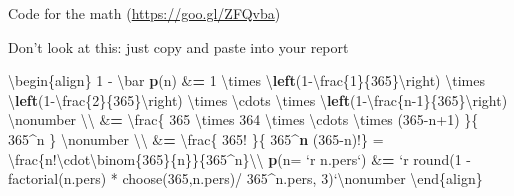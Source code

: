 \documentclass[ignorenonframetext,]{beamer}
\newenvironment{Shaded}{\begin{snugshade}}{\end{snugshade}}
\newcommand{\KeywordTok}[1]{\textcolor[rgb]{0.13,0.29,0.53}{\textbf{{#1}}}}
\newcommand{\DataTypeTok}[1]{\textcolor[rgb]{0.13,0.29,0.53}{{#1}}}
\newcommand{\DecValTok}[1]{\textcolor[rgb]{0.00,0.00,0.81}{{#1}}}
\newcommand{\StringTok}[1]{\textcolor[rgb]{0.31,0.60,0.02}{{#1}}}
\newcommand{\ErrorTok}[1]{\textcolor[rgb]{0.64,0.00,0.00}{\textbf{{#1}}}}
\newcommand{\NormalTok}[1]{{#1}}
\begin{document}
\begin{frame}[fragile]{Code for the math (\url{https://goo.gl/ZFQvba})}

Don't look at this: just copy and paste into your report

\begin{Shaded}
\begin{Highlighting}[]
\NormalTok{\textbackslash{}begin\{align\} }
 \DecValTok{1} \NormalTok{-}\StringTok{ }\NormalTok{\textbackslash{}bar }\KeywordTok{p}\NormalTok{(n) &}\ErrorTok{=}\StringTok{ }\DecValTok{1} \NormalTok{\textbackslash{}times \textbackslash{}}\KeywordTok{left}\NormalTok{(}\DecValTok{1}\NormalTok{-\textbackslash{}frac\{}\DecValTok{1}\NormalTok{\}\{}\DecValTok{365}\NormalTok{\}\textbackslash{}right) }
 \NormalTok{\textbackslash{}times \textbackslash{}}\KeywordTok{left}\NormalTok{(}\DecValTok{1}\NormalTok{-\textbackslash{}frac\{}\DecValTok{2}\NormalTok{\}\{}\DecValTok{365}\NormalTok{\}\textbackslash{}right) \textbackslash{}times \textbackslash{}cdots \textbackslash{}times }
 \NormalTok{\textbackslash{}}\KeywordTok{left}\NormalTok{(}\DecValTok{1}\NormalTok{-\textbackslash{}frac\{n}\DecValTok{-1}\NormalTok{\}\{}\DecValTok{365}\NormalTok{\}\textbackslash{}right) \textbackslash{}nonumber  \textbackslash{}\textbackslash{}  }
 \NormalTok{&}\ErrorTok{=}\StringTok{ }\NormalTok{\textbackslash{}frac\{ }\DecValTok{365} \NormalTok{\textbackslash{}times }\DecValTok{364} \NormalTok{\textbackslash{}times \textbackslash{}cdots \textbackslash{}times }
   \NormalTok{(}\DecValTok{365}\NormalTok{-n}\DecValTok{+1}\NormalTok{) \}\{ }\DecValTok{365}\NormalTok{^n \} \textbackslash{}nonumber \textbackslash{}\textbackslash{} }
 \NormalTok{&}\ErrorTok{=}\StringTok{ }\NormalTok{\textbackslash{}frac\{ }\DecValTok{365}\NormalTok{!}\StringTok{ }\NormalTok{\}\{ }\DecValTok{365}\NormalTok{^}\KeywordTok{n} \NormalTok{(}\DecValTok{365}\NormalTok{-n)!\} =}\StringTok{ }
\StringTok{   }\NormalTok{\textbackslash{}frac\{n!\textbackslash{}cdot\textbackslash{}binom\{}\DecValTok{365}\NormalTok{\}\{n\}\}\{}\DecValTok{365}\NormalTok{^n\}\textbackslash{}\textbackslash{}}
\KeywordTok{p}\NormalTok{(}\DataTypeTok{n=} \StringTok{`}\DataTypeTok{r n.pers}\StringTok{`}\NormalTok{) &}\ErrorTok{=}\StringTok{ `}\DataTypeTok{r  }
\DataTypeTok{ round(1 - factorial(n.pers) * }
\DataTypeTok{         choose(365,n.pers)/ 365^n.pers, 3)}\StringTok{`}\NormalTok{\textbackslash{}nonumber}
\NormalTok{\textbackslash{}end\{align\}}
\end{Highlighting}
\end{Shaded}

\end{frame}
\end{document}
